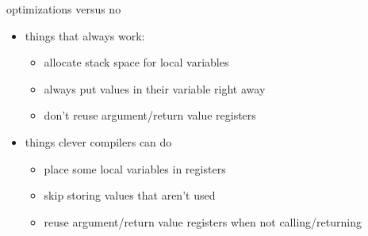 \begin{frame}{optimizations versus no}
    \begin{itemize}
    \item things that always work:
        \begin{itemize}
        \item allocate stack space for local variables
        \item always put values in their variable right away
        \item don't reuse argument/return value registers
        \end{itemize}
    \item things clever compilers can do
        \begin{itemize}
        \item place some local variables in registers
        \item skip storing values that aren't used
        \item reuse argument/return value registers when not calling/returning
        \end{itemize}
    \end{itemize}
\end{frame}

